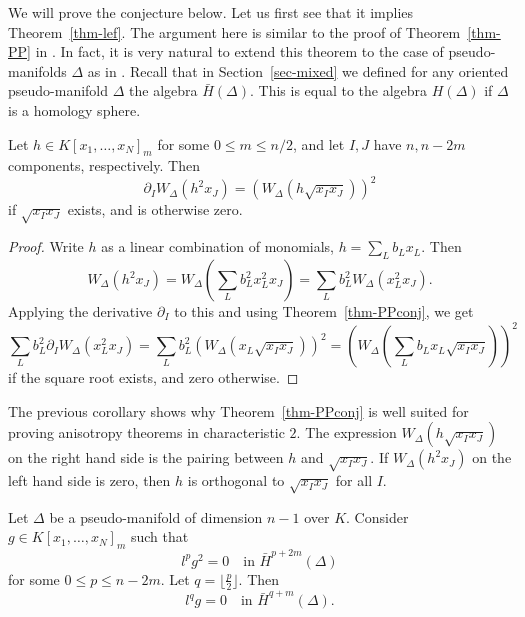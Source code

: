 We will prove the conjecture below. Let us first see that it implies Theorem~\ref{thm-lef}. The argument here is similar to the proof of Theorem~\ref{thm-PP} in \cite{PapadakisPetrotou}. In fact, it is very natural to extend this theorem to the case of pseudo-manifolds $\Delta$ as in \cite{APP}. Recall that in Section~\ref{sec-mixed} we defined for any oriented pseudo-manifold $\Delta$ the algebra $\bar{H}(\Delta)$. This is equal to the algebra $H(\Delta)$ if $\Delta$ is a homology sphere.

\begin{coro} \label{cor-PPconj}
Let $h \in K[x_1,\ldots, x_N]_m$ for  some $0 \leq m \leq n/2$, and let $I, J$ have $n, n - 2m$ components, respectively. Then
\[ \partial_I W_\Delta(h^2 x_J) = (W_\Delta(h \sqrt{x_I x_J}))^2 \]
if $\sqrt{x_I x_J}$ exists, and is otherwise zero.
\end{coro}

\begin{proof}
Write $h$ as a linear combination of monomials, $h=\sum_L b_L x_L$. Then
\[ W_\Delta(h^2 x_J) = W_\Delta ( \sum_L b_L^2 x_L^2 x_J) = \sum_L b_L^2 W_\Delta (x_L^2 x_J).\]
Applying the derivative $\partial_I$ to this and using  Theorem~\ref{thm-PPconj}, we get
\[  \sum_L b_L^2 \partial_I W_\Delta (x_L^2 x_J) = \sum_L b_L^2 (W_\Delta (x_L \sqrt{x_I x_J}))^2 = (W_\Delta ( \sum_L b_L x_L \sqrt{x_I x_J}))^2\]
if the square root exists, and zero otherwise.
\end{proof}

The previous corollary shows why Theorem~\ref{thm-PPconj} is well suited for proving anisotropy theorems in characteristic $2$. The expression $W_\Delta(h \sqrt{x_I x_J})$ on the right hand side is the \Po pairing between $h$ and $\sqrt{x_I x_J}$. If $W_\Delta(h^2 x_J)$ on the left hand side is zero, then $h$ is orthogonal to $\sqrt{x_I x_J}$ for all $I$.

\begin{coro} \label{cor-reduce}
Let $\Delta$ be a pseudo-manifold of dimension $n-1$ over $K$. Consider $g\in K[x_1,\ldots, x_N]_m$ such that 
\[ l^p g^2 = 0 \quad \text{in $\bar{H}^{p+2m}(\Delta)$}\]
for some  $0\leq p \leq n-2m$. 
Let $q = \lfloor \frac{p}{2}\rfloor$. Then
\[ l^q g = 0 \quad \text{in $\bar{H}^{q+m}(\Delta)$.}\]
\end{coro}

